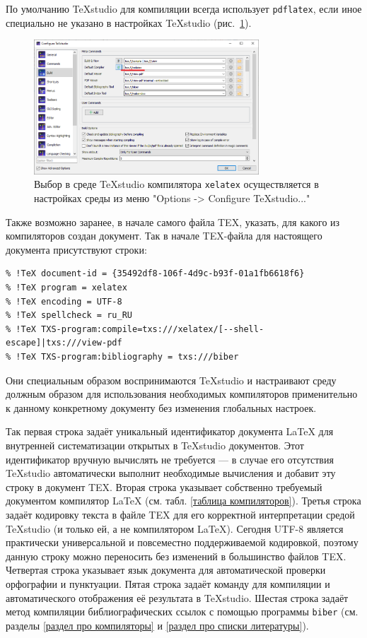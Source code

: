 \documentclass[workbook]{fefudoc}
\begin{document}
По умолчанию TeXstudio для компиляции всегда использует \texttt{pdflatex}, если иное специально не указано в настройках TeXstudio (рис.~\ref{texstudio-options}).
\begin{figure}[ht]
\centering
\includegraphics[width=0.75\textwidth]{workbook-extras/texstudio-options}
\caption{Выбор в среде TeXstudio компилятора \texttt{xelatex} осуществляется в настройках среды из меню "Options -> Configure TeXstudio..."}
\label{texstudio-options}
\end{figure}

Также возможно заранее, в начале самого файла TEX, указать, для какого из компиляторов создан документ.
Так в начале TEX-файла для настоящего документа присутствуют строки:
\begin{verbatim}
% !TeX document-id = {35492df8-106f-4d9c-b93f-01a1fb6618f6}
% !TeX program = xelatex
% !TeX encoding = UTF-8
% !TeX spellcheck = ru_RU
% !TeX TXS-program:compile=txs:///xelatex/[--shell-escape]|txs:///view-pdf
% !TeX TXS-program:bibliography = txs:///biber
\end{verbatim}

Они специальным образом воспринимаются TeXstudio и настраивают среду должным образом для использования необходимых компиляторов применительно к данному конкретному документу без изменения глобальных настроек.

Так первая строка задаёт уникальный идентификатор документа \LaTeX{} для внутренней систематизации открытых в TeXstudio документов.
Этот идентификатор вручную вычислять не требуется --- в случае его отсутствия TeXstudio автоматически выполнит необходимые вычисления и добавит эту строку в документ TEX.
Вторая строка указывает собственно требуемый документом компилятор \LaTeX{} (см. табл. \ref{таблица компиляторов}).
Третья строка задаёт кодировку текста в файле TEX для его корректной интерпретации средой TeXstudio (и только ей, а не компилятором \LaTeX{}).
Сегодня UTF-8 является практически универсальной и повсеместно поддерживаемой кодировкой, поэтому данную строку можно переносить без изменений в большинство файлов TEX.
Четвертая строка указывает язык документа для автоматической проверки орфографии и пунктуации.
Пятая строка задаёт команду для компиляции и автоматического отображения её результата в TeXstudio.
Шестая строка задаёт метод компиляции библиографических ссылок с помощью программы \texttt{biber} (см. разделы \ref{раздел про компиляторы} и \ref{раздел про списки литературы}).
\end{document}
